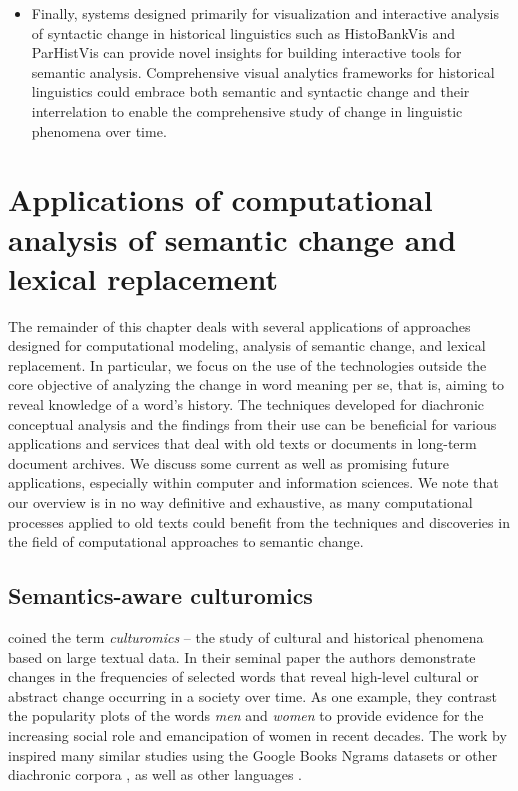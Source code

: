 \documentclass[output=paper]{langsci/langscibook}
\begin{document}
\begin{itemize}
\item Finally, systems designed primarily for visualization and interactive analysis of syntactic change in historical linguistics such as HistoBankVis \citep{schatzle:hal-02914284} and ParHistVis \citep{kalouli2019parhistvis} can provide novel insights for building interactive tools for semantic analysis.
Comprehensive visual analytics frameworks for historical linguistics could  embrace both semantic and syntactic change and their interrelation to enable the comprehensive study of change in linguistic phenomena over time. 
\end{itemize}

\section{Applications of computational analysis of semantic change and lexical replacement}
The remainder of this chapter deals with several applications of approaches designed for computational modeling, analysis of semantic change, and lexical replacement. In particular, we focus on the use of the technologies outside  the core objective of analyzing the change in word meaning per se, that is, aiming to reveal knowledge of a word's history.
The techniques developed for diachronic conceptual analysis and the findings from their use can be beneficial for various applications and services that deal with old texts or documents in long-term document archives. We discuss some current as well as promising future applications, especially within computer and information sciences. We note that our overview is in no way definitive and exhaustive, as many computational processes applied to old texts could benefit from the techniques and discoveries in the field of computational approaches to semantic change.

\subsection{Semantics-aware culturomics} \citet{michel2011quantitative} 
coined the term \emph{culturomics} -- the study of cultural and historical phenomena based on large textual data. In their seminal paper the authors
demonstrate changes in the frequencies of selected words that reveal high-level cultural or abstract change occurring in a society over time. As one example, they contrast the popularity plots of the words \emph{men} and \emph{women} to provide evidence for the increasing social role and emancipation of women in recent decades. The work by \citet{michel2011quantitative} inspired many similar studies using the Google Books Ngrams datasets \citep[e.g.][]{acerbi-etal-2013,bentley-etal-2014,pechenick-etal-2015,iliev-etal-2016} or other diachronic corpora \citep[e.g.][]{hills-adelman-2015,snefjella-etal-2018,kutuzov2017tracing}, as well as other languages \citep[e.g.][]{viklund-borin-2016,hengchen2019nation,marjanen2020expansion}.
\end{document}
